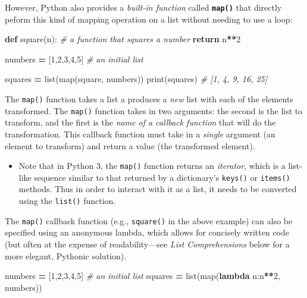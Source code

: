 \documentclass[]{book}
\newenvironment{Shaded}{\begin{snugshade}}{\end{snugshade}}
\newcommand{\KeywordTok}[1]{\textcolor[rgb]{0.13,0.29,0.53}{\textbf{#1}}}
\newcommand{\DecValTok}[1]{\textcolor[rgb]{0.00,0.00,0.81}{#1}}
\newcommand{\CommentTok}[1]{\textcolor[rgb]{0.56,0.35,0.01}{\textit{#1}}}
\newcommand{\ControlFlowTok}[1]{\textcolor[rgb]{0.13,0.29,0.53}{\textbf{#1}}}
\newcommand{\OperatorTok}[1]{\textcolor[rgb]{0.81,0.36,0.00}{\textbf{#1}}}
\newcommand{\BuiltInTok}[1]{#1}
\newcommand{\NormalTok}[1]{#1}
\providecommand{\tightlist}{%
  \setlength{\itemsep}{0pt}\setlength{\parskip}{0pt}}
\begin{document}
However, Python also provides a \emph{built-in function} called
\textbf{\texttt{map()}} that directly peform this kind of mapping
operation on a list without needing to use a loop:

\begin{Shaded}
\begin{Highlighting}[]
\KeywordTok{def}\NormalTok{ square(n):  }\CommentTok{# a function that squares a number}
    \ControlFlowTok{return}\NormalTok{ n}\OperatorTok{**}\DecValTok{2}

\NormalTok{numbers }\OperatorTok{=}\NormalTok{ [}\DecValTok{1}\NormalTok{,}\DecValTok{2}\NormalTok{,}\DecValTok{3}\NormalTok{,}\DecValTok{4}\NormalTok{,}\DecValTok{5}\NormalTok{]  }\CommentTok{# an initial list}

\NormalTok{squares }\OperatorTok{=} \BuiltInTok{list}\NormalTok{(}\BuiltInTok{map}\NormalTok{(square, numbers))}
\BuiltInTok{print}\NormalTok{(squares)  }\CommentTok{# [1, 4, 9, 16, 25]}
\end{Highlighting}
\end{Shaded}

The \texttt{map()} function takes a list a produces a \emph{new} list
with each of the elements transformed. The \texttt{map()} function takes
in two arguments: the second is the list to transform, and the first is
the \emph{name of a callback function} that will do the transformation.
This callback function must take in a \emph{single} argument (an element
to transform) and return a value (the transformed element).

\begin{itemize}
\tightlist
\item
  Note that in Python 3, the \texttt{map()} function returns an
  \emph{iterator}, which is a list-like sequence similar to that
  returned by a dictionary's \texttt{keys()} or \texttt{items()}
  methods. Thus in order to interact with it as a list, it needs to be
  converted using the \texttt{list()} function.
\end{itemize}

The \texttt{map()} callback function (e.g., \texttt{square()} in the
above example) can also be specified using an anonymous lambda, which
allows for concisely written code (but often at the expense of
readability---see \emph{List Comprehensions} below for a more elegant,
Pythonic solution).

\begin{Shaded}
\begin{Highlighting}[]
\NormalTok{numbers }\OperatorTok{=}\NormalTok{ [}\DecValTok{1}\NormalTok{,}\DecValTok{2}\NormalTok{,}\DecValTok{3}\NormalTok{,}\DecValTok{4}\NormalTok{,}\DecValTok{5}\NormalTok{]  }\CommentTok{# an initial list}
\NormalTok{squares }\OperatorTok{=} \BuiltInTok{list}\NormalTok{(}\BuiltInTok{map}\NormalTok{(}\KeywordTok{lambda}\NormalTok{ n:n}\OperatorTok{**}\DecValTok{2}\NormalTok{, numbers))}
\end{Highlighting}
\end{Shaded}
\end{document}
